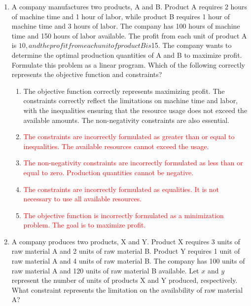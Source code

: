 \documentclass{article}%
\newcommand{\incorrect}[1]{\textcolor{red}{#1}}
\begin{document}
\begin{enumerate}
\begin{enumerate}
\item \incorrect{Answer E is incorrect. Both linear and non-linear programming can handle continuous and discrete variables (though integer programming is a separate subfield).}%
\end{enumerate}%
\vspace{1em}%
\item A company manufactures two products, A and B. Product A requires 2 hours of machine time and 1 hour of labor, while product B requires 1 hour of machine time and 3 hours of labor. The company has 100 hours of machine time and 150 hours of labor available. The profit from each unit of product A is $10, and the profit from each unit of product B is $15.  The company wants to determine the optimal production quantities of A and B to maximize profit. Formulate this problem as a linear program. Which of the following correctly represents the objective function and constraints?%
\begin{enumerate}%
\item The objective function correctly represents maximizing profit. The constraints correctly reflect the limitations on machine time and labor, with the inequalities ensuring that the resource usage does not exceed the available amounts. The non-negativity constraints are also essential.%
\item \incorrect{The constraints are incorrectly formulated as greater than or equal to inequalities.  The available resources cannot exceed the usage.}%
\item \incorrect{The non-negativity constraints are incorrectly formulated as less than or equal to zero. Production quantities cannot be negative.}%
\item \incorrect{The constraints are incorrectly formulated as equalities.  It is not necessary to use all available resources.}%
\item \incorrect{The objective function is incorrectly formulated as a minimization problem. The goal is to maximize profit.}%
\end{enumerate}%
\vspace{1em}%
\item A company produces two products, X and Y. Product X requires 3 units of raw material A and 2 units of raw material B. Product Y requires 1 unit of raw material A and 4 units of raw material B. The company has 100 units of raw material A and 120 units of raw material B available.  Let $x$ and $y$ represent the number of units of products X and Y produced, respectively. What constraint represents the limitation on the availability of raw material A?%

\end{enumerate}
\end{document}
